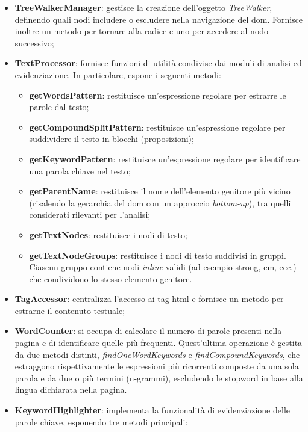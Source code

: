 \begin{itemize}
  \item \textbf{TreeWalkerManager}: gestisce la creazione dell’oggetto \textit{TreeWalker}, definendo quali nodi includere o escludere nella navigazione del \gls{dom}. Fornisce inoltre un metodo per tornare alla radice e uno per accedere al nodo successivo;
  \item \textbf{TextProcessor}: fornisce funzioni di utilità condivise dai moduli di analisi ed evidenziazione. In particolare, espone i seguenti metodi:
  \begin{itemize}
    \item \textbf{getWordsPattern}: restituisce un'espressione regolare per estrarre le parole dal testo;
    \item \textbf{getCompoundSplitPattern}: restituisce un’espressione regolare per suddividere il testo in blocchi (proposizioni);
    \item \textbf{getKeywordPattern}: restituisce un’espressione regolare per identificare una parola chiave nel testo;
    \item \textbf{getParentName}: restituisce il nome dell’elemento genitore più vicino (risalendo la gerarchia del \gls{dom} con un approccio \textit{bottom-up}), tra quelli considerati rilevanti per l’analisi;
    \item \textbf{getTextNodes}: restituisce i nodi di testo;
    \item \textbf{getTextNodeGroups}: restituisce i nodi di testo suddivisi in gruppi. Ciascun gruppo contiene nodi \textit{inline} validi (ad esempio strong, em, ecc.) che condividono lo stesso elemento genitore.
  \end{itemize}
  \item \textbf{TagAccessor}: centralizza l’accesso ai tag \gls{html} e fornisce un metodo per estrarne il contenuto testuale;
  \item \textbf{WordCounter}: si occupa di calcolare il numero di parole presenti nella pagina e di identificare quelle più frequenti. Quest’ultima operazione è gestita da due metodi distinti, \textit{findOneWordKeywords} e \textit{findCompoundKeywords}, che estraggono rispettivamente le espressioni più ricorrenti composte da una sola parola e da due o più termini (n-grammi), escludendo le \gls{stopword} in base alla lingua dichiarata nella pagina.
  \item \textbf{KeywordHighlighter}: implementa la funzionalità di evidenziazione delle parole chiave, esponendo tre metodi principali:
  \begin{itemize}

\end{itemize}
\end{itemize}
